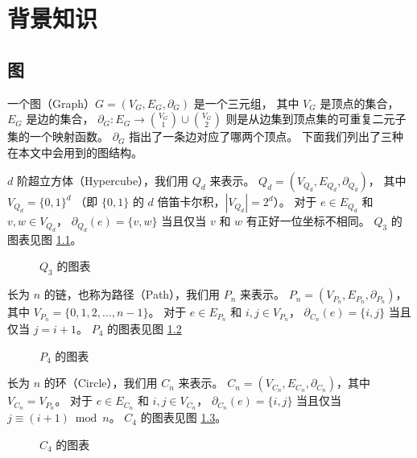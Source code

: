 
\chapter{背景知识}
\label{Chapter 2}

\section{图}
\label{Section 2.1}

一个图（Graph）$G = (V_G, E_G, \partial_G)$ 是一个三元组，
其中 $V_G$ 是顶点的集合，$E_G$ 是边的集合，
$\partial_G \colon E_G \rightarrow \binom{V_G}{1} \cup \binom{V_G}{2}$
则是从边集到顶点集的可重复二元子集的一个映射函数。
$\partial_G$ 指出了一条边对应了哪两个顶点。
下面我们列出了三种在本文中会用到的图结构。

$d$ 阶超立方体（Hypercube），我们用 $Q_d$ 来表示。
$Q_d = (V_{Q_d}, E_{Q_d}, \partial_{Q_d})$，
其中 $V_{Q_d} = \{0, 1\}^d$
（即 $\{0, 1\}$ 的 $d$ 倍笛卡尔积，$|V_{Q_d}| = 2^d$）。
对于 $e \in E_{Q_d}$ 和 $v, w \in V_{Q_d}$，
$\partial_{Q_d}(e) = \{v, w\}$ 当且仅当 $v$ 和 $w$ 有正好一位坐标不相同。
$Q_3$ 的图表见图 \ref{Figure 1}。

\begin{figure}[h!]
	\centering
	
	\caption{$Q_3$ 的图表}
	\label{Figure 1}
\end{figure}

长为 $n$ 的链，也称为路径（Path），我们用 $P_n$ 来表示。
$P_n = (V_{P_n}, E_{P_n}, \partial_{P_n})$，
其中 $V_{P_n} = \{0, 1, 2, \dots, n - 1\}$。
对于 $e \in E_{P_n}$ 和 $i, j \in V_{P_n}$，
$\partial_{C_n}(e) = \{i, j\}$ 当且仅当 $j = i + 1$。
$P_4$ 的图表见图 \ref{Figure 2}

\begin{figure}[h!]
	\centering
	
	\caption{$P_4$ 的图表}
	\label{Figure 2}
\end{figure}

长为 $n$ 的环（Circle），我们用 $C_n$ 来表示。
$C_n = (V_{C_n}, E_{C_n}, \partial_{C_n})$，其中 $V_{C_n} = V_{P_n}$。
对于 $e \in E_{C_n}$ 和 $i, j \in V_{C_n}$，
$\partial_{C_n}(e) = \{i, j\}$ 当且仅当 $j \equiv (i + 1) \bmod n$。
$C_4$ 的图表见图 \ref{Figure 3}。

\begin{figure}[h!]
	\centering
	
	\caption{$C_4$ 的图表}
	\label{Figure 3}
\end{figure}

